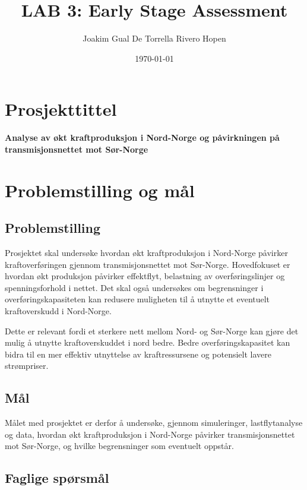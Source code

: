 \documentclass[12pt,a4paper]{article}
\title{LAB 3: Early Stage Assessment}
\author{Joakim Gual De Torrella Rivero Hopen}
\date{\today}
\begin{document}
\maketitle

\section{Prosjekttittel}

\textbf{Analyse av økt kraftproduksjon i Nord-Norge og påvirkningen
på transmisjonsnettet mot Sør-Norge}


\section{Problemstilling og mål}

\subsection{Problemstilling}

Prosjektet skal undersøke hvordan økt kraftproduksjon i Nord-Norge
påvirker kraftoverføringen gjennom transmisjonsnettet mot Sør-Norge.
Hovedfokuset er hvordan økt produksjon påvirker effektflyt,
belastning av overføringslinjer og spenningsforhold i nettet.
Det skal også undersøkes om begrensninger i overføringskapasiteten
kan redusere muligheten til å utnytte et eventuelt kraftoverskudd
i Nord-Norge.

Dette er relevant fordi et sterkere nett mellom Nord- og Sør-Norge
kan gjøre det mulig å utnytte kraftoverskuddet i nord bedre.
Bedre overføringskapasitet kan bidra til en mer effektiv utnyttelse
av kraftressursene og potensielt lavere strømpriser.

\subsection{Mål}

Målet med prosjektet er derfor å undersøke, gjennom simuleringer,
lastflytanalyse og data, hvordan økt kraftproduksjon i Nord-Norge
påvirker transmisjonsnettet mot Sør-Norge, og hvilke begrensninger
som eventuelt oppstår.

\subsection{Faglige spørsmål}
\end{document}

